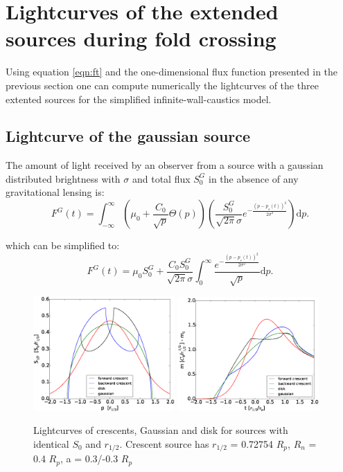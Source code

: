 \documentclass[usenatbib]{mn2e}
\begin{document}
\section{Lightcurves of the extended sources during fold crossing}\label{sec:fold-crossing}

Using equation \ref{eqn:ft} and the one-dimensional flux function
presented in the previous section one can compute numerically the
lightcurves of the three extented sources for the simplified
infinite-wall-caustics model.

\subsection{Lightcurve of the gaussian source}

The amount of light received by an observer from a source with a gaussian distributed brightness with $\sigma$ and total flux $S_0^G$ in the absence of any gravitational lensing is:
\begin{equation}
 F^G(t) = \int_{-\infty}^\infty  \left( \mu_0 + \frac{C_0}{\sqrt{p}} \Theta \left( p \right) \right) \left( \frac{S_0^G}{\sqrt{2 \pi} \sigma} e^{-\frac{(p-p_s(t))^2}{2 \sigma^2}} \right) \mathrm{d}p.
\end{equation}

which can be simplified to:
\begin{equation}
 F^G(t) = \mu_0 S_0^G + \frac{C_0 S_0^G}{\sqrt{2\pi} \sigma} \int_{0}^\infty \frac{e^{-\frac{(p-p_s(t))^2}{2 \sigma^2}}}{\sqrt{p}} \mathrm{d}p.
\end{equation}



\begin{figure}
\centering
	\includegraphics[width = 0.48\textwidth]{figures/S1D_all.eps}
	\includegraphics[width = 0.48\textwidth]{figures/4source_magnification.eps}
\caption{\label{fig:lightcurve_gauss} Lightcurves of crescents, Gaussian and disk for sources with identical $S_0$ and $r_{1/2}$. Crescent source has $r_{1/2}$ = 0.72754 $R_p$, $R_n$ = 0.4 $R_p$, a = 0.3/-0.3 $R_p$ }
\end{figure}
\end{document}
